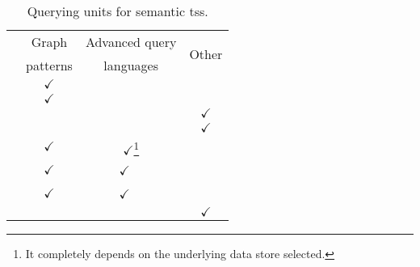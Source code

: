 \begin{savenotes}
  \begin{table}[htbp]
    \caption{Querying units for semantic \ac{ts}s.}
    \centering
    \begin{tabular}{l c c c}
      \hline 
	& Graph  & Advanced query  & \multirow{2}{*}{Other} \\
	& patterns  & languages  & ~ \\
      \hline
      \midtsc{} & $\checkmark$ & & \\ %
      \midsws{} & $\checkmark$ & & \\
      \midstuples{} & & & $\checkmark$ \\
      \midcspaces{} & & & $\checkmark$ \\ %
      \midtscpp{} & $\checkmark$ & $\checkmark$\footnote{It completely depends on the underlying data store selected.} & \\ %
      \midtripcom{} & $\checkmark$ & $\checkmark$~~ & \\
      \midsmartmt{} & $\checkmark$ & $\checkmark$~~ & \\
      \midnardini{} & & & $\checkmark$ \\
      \hline
    \end{tabular}
    \label{tab:query_comparison}
  \end{table}
\end{savenotes}

